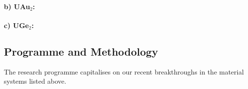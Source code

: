 \paragraph{b) UAu$_2$:}

\paragraph{c) UGe$_2$:}





\subsection*{Programme and Methodology}
\noindent
The research programme capitalises on our recent breakthroughs in the material systems listed above. %

